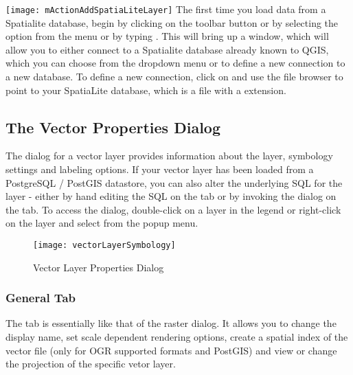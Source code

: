 \texttt{[image: mActionAddSpatiaLiteLayer]}
The first time you load data from a Spatialite database, begin by clicking on the 
 toolbar button or by selecting the 
option from the  menu or by typing . 
This will bring up a window, which will allow you to either connect to a Spatialite database already known to QGIS, which 
you can choose from the dropdown menu or to define a new connection to a new database. To define a new connection, 
click on  and use the file browser to point to your SpatiaLite database, 
which is a file with a  extension.

\subsection{The Vector Properties Dialog}\label{sec:vectorprops}

The  dialog for a vector layer 
provides information about the layer, symbology
settings and labeling options. If your vector layer has been loaded from a
PostgreSQL / PostGIS datastore, you can also alter the underlying SQL for the
layer - either by hand editing the SQL on the  tab or by
invoking the  dialog on the  tab. 
To access the
 dialog, double-click on a layer in the legend or right-click on the
layer and select  from the popup menu.

\begin{figure}[H]
   \begin{center}
   \caption{Vector Layer Properties Dialog \nixcaption}\label{fig:vector_symbology}\smallskip
   \texttt{[image: vectorLayerSymbology]} 
\end{center}  
\end{figure}

\subsubsection{General Tab}\label{vectorgeneraltab}
The  tab is essentially like that of the raster dialog. It allows you
to change the display name, set scale dependent rendering options, create a spatial 
index of the vector file (only for OGR supported formats and PostGIS) and view or
change the projection of the specific vetor layer.


